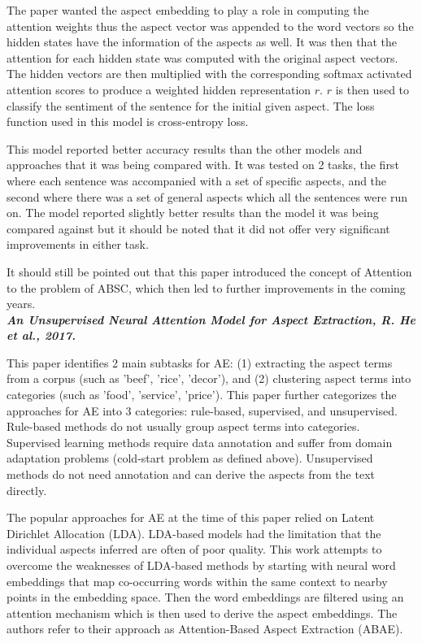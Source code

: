 \documentclass[conference]{IEEEtran}
\begin{document}
The paper wanted the aspect embedding to play a role in computing the attention weights thus the aspect vector was appended to the word vectors so the hidden states have the information of the aspects as well. It was then that the attention for each hidden state was computed with the original aspect vectors. The hidden vectors are then multiplied with the corresponding softmax activated attention scores to produce a weighted hidden representation $r$. $r$ is then used to classify the sentiment of the sentence for the initial given aspect. The loss function used in this model is cross-entropy loss.

This model reported better accuracy results than the other models and approaches that it was being compared with. It was tested on 2 tasks, the first where each sentence was accompanied with a set of specific aspects, and the second where there was a set of general aspects which all the sentences were run on. The model reported slightly better results than the model it was being compared against but it should be noted that it did not offer very significant improvements in either task.

It should still be pointed out that this paper introduced the concept of Attention to the problem of ABSC, which then led to further improvements in the coming years.\\

\textit{\textbf{An Unsupervised Neural Attention Model for Aspect Extraction, R. He et al., 2017.}}

This paper identifies 2 main subtasks for AE: (1) extracting the aspect terms from a corpus (such as 'beef', 'rice', 'decor'), and (2) clustering aspect terms into categories (such as 'food', 'service', 'price'). This paper further categorizes the approaches for AE into 3 categories: rule-based, supervised, and unsupervised. Rule-based methods do not usually group aspect terms into categories. Supervised learning methods require data annotation and suffer from domain adaptation problems (cold-start problem as defined above). Unsupervised methods do not need annotation and can derive the aspects from the text directly.

The popular approaches for AE at the time of this paper relied on Latent Dirichlet Allocation (LDA). LDA-based models had the limitation that the individual aspects inferred are often of poor quality. This work attempts to overcome the weaknesses of LDA-based methods by starting with neural word embeddings that map co-occurring words within the same context to nearby points in the embedding space. Then the word embeddings are filtered using an attention mechanism which is then used to derive the aspect embeddings. The authors refer to their approach as Attention-Based Aspect Extraction (ABAE).
\end{document}
